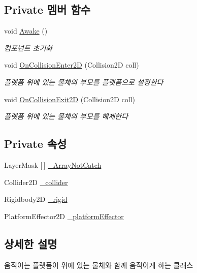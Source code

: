 \subsection*{Private 멤버 함수}
\begin{DoxyCompactItemize}
\item 
void \mbox{\hyperlink{class_platform_catcher_a85b586a2617a568e4201c3f3b3c4103f}{Awake}} ()
\begin{DoxyCompactList}\small\item\em 컴포넌트 초기화 \end{DoxyCompactList}\item 
void \mbox{\hyperlink{class_platform_catcher_ae55ceae7b20536053cc1dbb12a71041e}{On\+Collision\+Enter2D}} (Collision2D coll)
\begin{DoxyCompactList}\small\item\em 플랫폼 위에 있는 물체의 부모를 플랫폼으로 설정한다 \end{DoxyCompactList}\item 
void \mbox{\hyperlink{class_platform_catcher_a8d350fc36f8ebc200f8a769bf4d1df69}{On\+Collision\+Exit2D}} (Collision2D coll)
\begin{DoxyCompactList}\small\item\em 플랫폼 위에 있는 물체의 부모를 해제한다 \end{DoxyCompactList}\end{DoxyCompactItemize}
\subsection*{Private 속성}
\begin{DoxyCompactItemize}
\item 
Layer\+Mask \mbox{[}$\,$\mbox{]} \mbox{\hyperlink{class_platform_catcher_a78ef499926b824a8f831cce7f9a430d2}{\+\_\+\+Array\+Not\+Catch}}
\item 
Collider2D \mbox{\hyperlink{class_platform_catcher_aa301b8dfc4e4d2248eeee749691a85a6}{\+\_\+collider}}
\item 
Rigidbody2D \mbox{\hyperlink{class_platform_catcher_ae8627f8ac9558d21ee7b73eb5bb7d202}{\+\_\+rigid}}
\item 
Platform\+Effector2D \mbox{\hyperlink{class_platform_catcher_a9a76fa21f5f0843c1115e36e50eb33f6}{\+\_\+platform\+Effector}}
\end{DoxyCompactItemize}


\subsection{상세한 설명}
움직이는 플랫폼이 위에 있는 물체와 함께 움직이게 하는 클래스 


